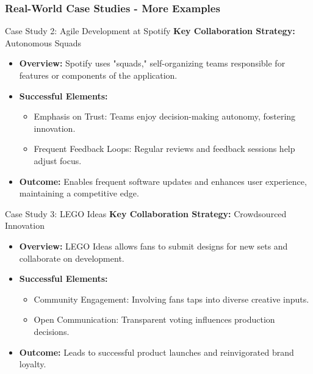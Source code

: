 \documentclass[aspectratio=169]{beamer}
\begin{document}
\begin{frame}[fragile]
    \frametitle{Real-World Case Studies - More Examples}
    \begin{block}{Case Study 2: Agile Development at Spotify}
        \textbf{Key Collaboration Strategy:} Autonomous Squads

        \begin{itemize}
            \item \textbf{Overview:}
                Spotify uses "squads," self-organizing teams responsible for features or components of the application.
            \item \textbf{Successful Elements:}
                \begin{itemize}
                    \item Emphasis on Trust: Teams enjoy decision-making autonomy, fostering innovation.
                    \item Frequent Feedback Loops: Regular reviews and feedback sessions help adjust focus.
                \end{itemize}
            \item \textbf{Outcome:}
                Enables frequent software updates and enhances user experience, maintaining a competitive edge.
        \end{itemize}
    \end{block}
    
    \vspace{1em}  %
    
    \begin{block}{Case Study 3: LEGO Ideas}
        \textbf{Key Collaboration Strategy:} Crowdsourced Innovation
        
        \begin{itemize}
            \item \textbf{Overview:}
                LEGO Ideas allows fans to submit designs for new sets and collaborate on development.
            \item \textbf{Successful Elements:}
                \begin{itemize}
                    \item Community Engagement: Involving fans taps into diverse creative inputs.
                    \item Open Communication: Transparent voting influences production decisions.
                \end{itemize}
            \item \textbf{Outcome:}
                Leads to successful product launches and reinvigorated brand loyalty.
        \end{itemize}
    \end{block}
\end{frame}
\end{document}
